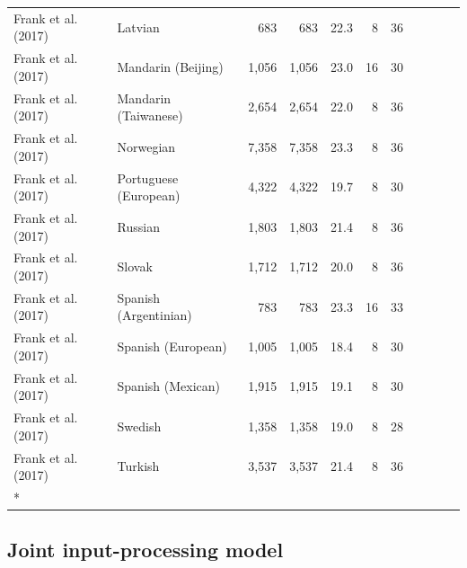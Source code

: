 \documentclass[
  11pt,
]{article}
\begin{document}
\begin{landscape}
\begin{longtable}[t]{llrrrrrclrr}
\hspace{1em}Frank et al. (2017) & Latvian & 683 & 683 & 22.3 & 8 & 36 &  &  &  & \\
\hspace{1em}Frank et al. (2017) & Mandarin (Beijing) & 1,056 & 1,056 & 23.0 & 16 & 30 &  &  &  & \\
\hspace{1em}Frank et al. (2017) & Mandarin (Taiwanese) & 2,654 & 2,654 & 22.0 & 8 & 36 &  &  &  & \\
\hspace{1em}Frank et al. (2017) & Norwegian & 7,358 & 7,358 & 23.3 & 8 & 36 &  &  &  & \\
\hspace{1em}Frank et al. (2017) & Portuguese (European) & 4,322 & 4,322 & 19.7 & 8 & 30 &  &  &  & \\
\hspace{1em}Frank et al. (2017) & Russian & 1,803 & 1,803 & 21.4 & 8 & 36 &  &  &  & \\
\hspace{1em}Frank et al. (2017) & Slovak & 1,712 & 1,712 & 20.0 & 8 & 36 &  &  &  & \\
\hspace{1em}Frank et al. (2017) & Spanish (Argentinian) & 783 & 783 & 23.3 & 16 & 33 &  &  &  & \\
\hspace{1em}Frank et al. (2017) & Spanish (European) & 1,005 & 1,005 & 18.4 & 8 & 30 &  &  &  & \\
\hspace{1em}Frank et al. (2017) & Spanish (Mexican) & 1,915 & 1,915 & 19.1 & 8 & 30 &  &  &  & \\
\hspace{1em}Frank et al. (2017) & Swedish & 1,358 & 1,358 & 19.0 & 8 & 28 &  &  &  & \\
\hspace{1em}Frank et al. (2017) & Turkish & 3,537 & 3,537 & 21.4 & 8 & 36 &  &  &  & \\*

\end{longtable}

\endgroup{}
\end{landscape}

\subsection{Joint input-processing
model}\label{joint-input-processing-model}
\end{document}
